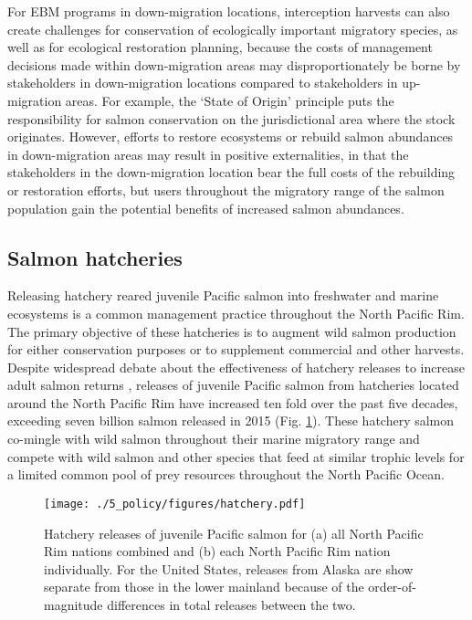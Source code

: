 For EBM programs in down-migration locations, interception harvests can also
create challenges for conservation of ecologically important migratory species,
as well as for ecological restoration planning, because the costs of management
decisions made within down-migration areas may disproportionately be borne by
stakeholders in down-migration locations compared to stakeholders in
up-migration areas. For example, the `State of Origin' principle puts the
responsibility for salmon conservation on the jurisdictional area where the
stock originates. However, efforts to restore ecosystems or rebuild salmon
abundances in down-migration areas may result in positive externalities, in that
the stakeholders in the down-migration location bear the full costs of the
rebuilding or restoration efforts, but users throughout the migratory range of
the salmon population gain the potential benefits of increased salmon
abundances.


\subsection{Salmon hatcheries}

Releasing hatchery reared juvenile Pacific salmon into freshwater and marine
ecosystems is a common management practice throughout the North Pacific Rim. The
primary objective of these hatcheries is to augment wild salmon production for
either conservation purposes or to supplement commercial and other harvests.
Despite widespread debate about the effectiveness of hatchery releases to
increase adult salmon returns \citep{Hilborn2000a, Wertheimer2001a,
Hilborn2001a}, releases of juvenile Pacific salmon from hatcheries located
around the North Pacific Rim have increased ten fold over the past five decades,
exceeding seven billion salmon released in 2015 (Fig. \ref{fig:ebm:3}). These
hatchery salmon co-mingle with wild salmon throughout their marine migratory
range and compete with wild salmon and other species that feed at similar
trophic levels for a limited common pool of prey resources throughout the North
Pacific Ocean.

\begin{figure}[htbp]
  \centering \texttt{[image: ./5\_policy/figures/hatchery.pdf]}
  \caption[Hatchery releases of juvenile Pacific salmon from North Pacific Rim
           nations]{Hatchery releases of juvenile Pacific salmon for (a) all
           North Pacific Rim nations combined and (b) each North Pacific Rim
           nation individually. For the United States, releases from Alaska are
           show separate from those in the lower mainland because of the
           order-of-magnitude differences in total releases between the two.}
  \label{fig:ebm:3}
\end{figure}

